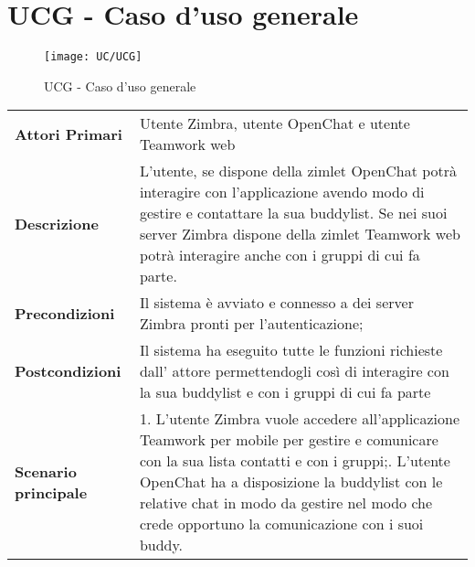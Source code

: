 \section{UCG - Caso d'uso generale}
	\begin{figure}[H] 
		\centering
		\texttt{[image: UC/UCG]}
		\caption{UCG - Caso d'uso generale}
	\end{figure}
	\begin{center}
	\bgroup
	\def\arraystretch{1.8}     
	\begin{longtable}{  p{4cm} | p{9.5cm} } 
		\textbf{Attori Primari} & Utente Zimbra, utente OpenChat e utente Teamwork web \\ 
		\textbf{Descrizione} & L'utente, se dispone della zimlet OpenChat potrà interagire con l'applicazione avendo modo di gestire e contattare la sua buddylist. Se nei suoi server Zimbra dispone della zimlet Teamwork web potrà interagire anche con i gruppi di cui fa parte. \\ 
		\textbf{Precondizioni}  & Il sistema è avviato e connesso a dei server Zimbra pronti per l'autenticazione; \\
		\textbf{Postcondizioni} & Il sistema ha eseguito tutte le funzioni richieste dall' attore permettendogli così di interagire con la sua buddylist e con i gruppi di cui fa parte  \\ 
		\textbf{Scenario principale} & 
		1. L’utente Zimbra vuole accedere all'applicazione Teamwork per mobile per gestire e comunicare con la sua lista contatti e con i gruppi;\newline
		2. L’utente OpenChat ha a disposizione la buddylist con le relative chat in modo da gestire nel modo che crede opportuno la comunicazione con i suoi buddy.
	\end{longtable}
	\egroup
\end{center}

